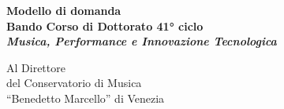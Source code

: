 \documentclass[a4paper,12pt]{article}
\begin{document}
\begin{center}
    {\Large\textbf{Modello di domanda}}\\[0.8cm]

    {\large\textbf{Bando Corso di Dottorato 41° ciclo}}\\[0.5cm]

    {\large\textbf{\textit{Musica, Performance e Innovazione Tecnologica}}}\\[1.5cm]
\end{center}

\begin{flushright}
Al Direttore\\
del Conservatorio di Musica\\
``Benedetto Marcello'' di Venezia\\[1cm]
\end{flushright}
\end{document}
